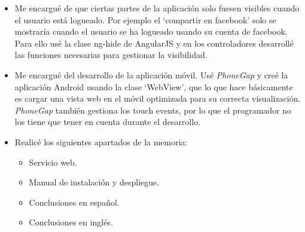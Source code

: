 \begin{itemize}
\item
Me encargué de que ciertas partes de la aplicación solo fuesen visibles cuando el usuario está logueado. Por ejemplo el `compartir en facebook' solo se mostraría cuando el usuario se ha logueado usando su cuenta de facebook. Para ello usé la clase ng-hide de AngularJS y en los controladores desarrollé las funciones necesarias para gestionar la visibilidad.

\item
Me encargué del desarrollo de la aplicación móvil. Usé \textit{PhoneGap} y creé la aplicación Android usando la clase `WebView', que lo que hace básicamente es cargar una vista web en el móvil optimizada para su correcta visualización. \textit{PhoneGap} también gestiona los touch events, por lo que el programador no los tiene que tener en cuenta durante el desarrollo.

\item
Realicé los siguientes apartados de la memoria:
\begin{itemize}
\item Servicio web.
\item Manual de instalación y despliegue.
\item Conclusiones en español.
\item Conclusiones en inglés.

\end{itemize}



\end{itemize}